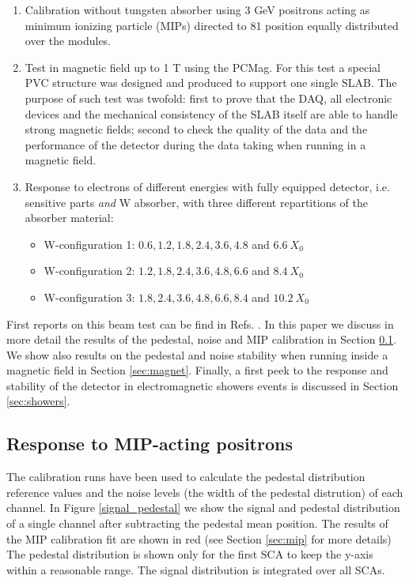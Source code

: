\documentclass[a4paper,11pt]{article}
\begin{document}
\begin{enumerate}
\item Calibration without tungsten absorber using 3 GeV positrons acting as minimum ionizing particle (MIPs) directed to 81 position equally distributed over the modules.
\item Test in magnetic field up to 1 T using the PCMag. For this test a special PVC structure was
designed and produced to support one single SLAB.	
The purpose of such test was twofold: first to prove that the DAQ, all electronic devices and the 
mechanical consistency of the SLAB itself are able
to handle strong magnetic fields; 
second to check the quality of the data and the performance of the detector during the data taking when running
in a magnetic field.
\item Response to electrons of different energies with fully equipped detector, i.e. sensitive parts {\it and} W absorber, with three different repartitions of the absorber material:
\begin{itemize}
\item W-configuration 1: $0.6,1.2,1.8,2.4,3.6,4.8$ and $6.6~X_{0}$
\item W-configuration 2: $1.2,1.8,2.4,3.6,4.8,6.6$ and $8.4~X_{0}$
\item W-configuration 3: $1.8,2.4,3.6,4.8,6.6,8.4$ and $10.2~X_{0}$
\end{itemize}
\end{enumerate}

First reports on this beam test can be find in
Refs. \cite{Irles:2018uum,Irles:2018hcd}. In this paper we discuss in more detail
the results of the pedestal, noise and MIP calibration in Section \ref{sec:calib}.
We show also results on the pedestal and noise stability when running inside
a magnetic field in Section \ref{sec:magnet}. Finally, a first peek to the 
response and stability of the detector in electromagnetic showers events is discussed in 
Section \ref{sec:showers}. 

\subsection{Response to MIP-acting positrons}
\label{sec:calib}

The calibration runs have been used to calculate the pedestal distribution reference values 
and the noise levels (the width of the pedestal distrution) of each channel.
In Figure \ref{signal_pedestal} we show the signal and pedestal distribution of a single channel after
subtracting the pedestal mean position. The results of the MIP calibration fit are shown in red (see Section \ref{sec:mip} for more details)
The pedestal distribution is shown only for the first SCA to keep the y-axis within a reasonable range.
The signal distribution is integrated over all SCAs.
\end{document}
